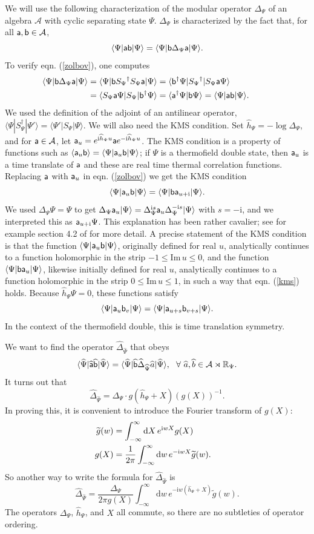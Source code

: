 \documentclass[11pt,a4paper]{article}
\def\t{{ \sf t}}
\def\a{{\sf a}}
\def\b{{\sf b}}
\def\i{{\mathrm i}}
\def\be{\begin{equation}}
\def\ee{\end{equation}}
\def\Im{{\mathrm{Im}}}
\def\h{\widehat}
\def\A{{\mathcal A}}
\def\d{{\mathrm d}}
\def\R{{\mathbb R}}
\def\t{\widetilde }
\def\h{\widehat}
\def\la{\langle}
\def\ra{\rangle}
\begin{document}
We will use the 
following   characterization of the modular operator $\Delta_\Psi$ of an algebra $\A$ with cyclic separating state $\Psi$. 
$\Delta_\Psi$ is characterized by the fact that, for all $\a,\b\in \A$,
\be\label{zolbov} \la\Psi|\a\b|\Psi\ra =\la\Psi|\b \Delta_\Psi \a|\Psi\ra. \ee      To verify eqn. (\ref{zolbov}), one computes \begin{align}\label{patience} \hspace{-.6cm}
\la\Psi|\b \Delta_\Psi\a|\Psi\ra&=\la\Psi|\b S_\Psi{}^\dagger S_\Psi\a|\Psi\ra=\la\b^\dagger\Psi| S_\Psi{}^\dagger |S_\Psi\a\Psi\ra\cr& =
\la  S_\Psi\a\Psi|S_\Psi| \b^\dagger\Psi\ra=\la\a^\dagger\Psi|\b\Psi\ra=\la\Psi|\a\b|\Psi\ra.\end{align}   We used the definition of the adjoint of
an antilinear operator, $\la\Psi|S_\Psi^\dagger|\Psi'\ra=\la\Psi'|S_\Psi|\Psi\ra$.  
We will also need the KMS condition.  Set $\h h_\Psi=-\log \Delta_\Psi$, and for $\a\in \A$, let $\a_u=e^{\i\h h_\Psi u} \a e^{-\i \h h_\Psi u}$.
The KMS condition is a property of functions such as $\la \a_u \b\ra=\la\Psi|\a_u \b |\Psi\ra$; if $\Psi$ is a thermofield double
state, then $\a_u$ is a time translate of $\a$ and these are real time thermal correlation functions.
Replacing $\a$ with $\a_u$ in eqn. (\ref{zolbov})  we get the KMS condition
\be\label{kms}\la\Psi|\a_u\b|\Psi\ra=\la\Psi|\b \a_{u+\i} |\Psi\ra. \ee
We used  $\Delta_\Psi\Psi=\Psi$ to get $\Delta_\Psi \a_u|\Psi\ra=\Delta_\Psi^{\i s} \a_u \Delta_\Psi^{-\i s}| \Psi\ra$ with $s=-\i$, and we interpreted this as $\a_{u+\i}\Psi$.
This explanation has been rather cavalier; see for example section 4.2 of \cite{OlderLectures} for more detail.  A precise statement of the KMS condition  is that the function $\la\Psi|\a_u \b|\Psi\ra$,
originally defined for real $u$, analytically continues to a function holomorphic in the strip $-1\leq \Im\,u\leq 0$, and the function $\la\Psi|\b\a_u|\Psi\ra$,
likewise initially defined for real $u$,  analytically continues to a function holomorphic in the strip $0\leq \Im\,u\leq 1$, in such a way that eqn. (\ref{kms}) holds. 
Because $\h h_\Psi\Psi=0$, these functions  satisfy
\be\label{wms}\la\Psi|\a_u\b_v|\Psi\ra=\la\Psi|\a_{u+s}\b_{v+s}|\Psi\ra.\ee
In the context of the thermofield double, this is time translation symmetry.

We want to find the operator $\h\Delta_{\h\Psi}$ that obeys
\be\label{toxo} \la \h\Psi|\h\a \h \b |\h\Psi\ra=\la\h\Psi|\h \b \h\Delta_{\h\Psi}\h a|\h\Psi\ra,~~ \forall~ \h a,\h b\in \A\rtimes\R_\Psi.\ee
It turns out that \be\label{turnco} \h\Delta_{\h\Psi}=\Delta_\Psi\cdot  g(\h h_\Psi+X)(g(X))^{-1}.\ee   In proving this, it is convenient to introduce the Fourier transform of $g(X)$:
\begin{align}\t g(w)& =\int_{-\infty}^\infty \d X \,e^{\i w X} g(X) \cr
                        g(X)&=\frac{1}{2\pi}\int_{-\infty}^\infty \d w\,e^{-\i wX}\t g(w). \end{align}
So another way to write the formula  for $\h\Delta_{\h\Psi} $ is
\be\label{nother} \h\Delta_{\h\Psi}=  \frac{\Delta_\Psi}{2\pi g(X)}\int_{-\infty}^\infty \d w \,e^{-\i w (\h h_\Psi+X)} \t g(w)        .\ee      
The operators $\Delta_\Psi$, $\h h_\Psi$, and $X$ all commute, so there are no subtleties of operator ordering.                 
\end{document}
